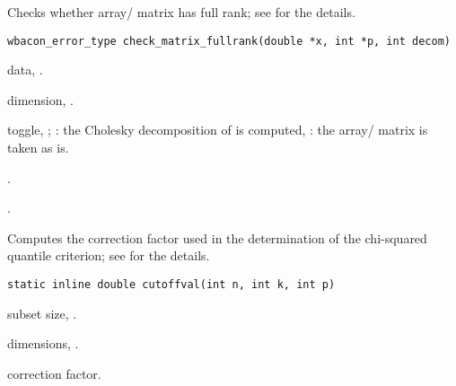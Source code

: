 \documentclass[a4paper,oneside,10pt,DIV=12]{scrreprt}
\begin{document}
\begin{Description}
Checks whether array/ matrix has full rank; see  for the
details.
\end{Description}
\begin{Usage}
\begin{verbatim}
wbacon_error_type check_matrix_fullrank(double *x, int *p, int decom)
\end{verbatim}
\end{Usage}
\begin{Arguments}
	\begin{ldescription}
		\item[\code{x}] data, .
		\item[\code{p}] dimension, \code{[int]}.
		\item[\code{decom}] toggle, \code{[int]}; : the Cholesky 
			decomposition of  is computed, : the array/ matrix
			 is taken as is.
	\end{ldescription}
\end{Arguments}
\begin{Dependency}
	\code{LAPACK::dpotrf}.
\end{Dependency}
\begin{Value}
.
\end{Value}

\begin{Description}
Computes the correction factor used in the determination of the chi-squared
quantile criterion; see  for the details.
\end{Description}
\begin{Usage}
\begin{verbatim}
static inline double cutoffval(int n, int k, int p)
\end{verbatim}
\end{Usage}
\begin{Arguments}
	\begin{ldescription}
		\item[\code{k}] subset size, \code{[int]}.
		\item[\code{n, p}] dimensions, \code{[int]}.
	\end{ldescription}
\end{Arguments}
\begin{Value}
correction factor.
\end{Value}
\end{document}
